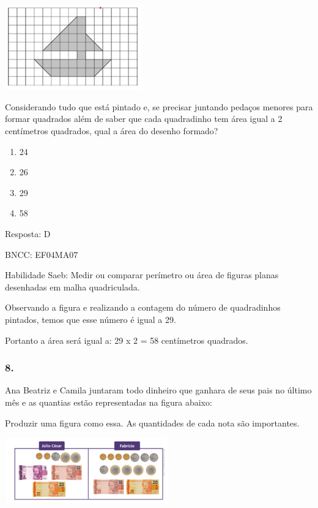 \includegraphics[width=2.32692in,height=1.43990in]{media/image144.png}

Considerando tudo que está pintado e, se precisar juntando pedaços
menores para formar quadrados além de saber que cada quadradinho tem
área igual a 2 centímetros quadrados, qual a área do desenho formado?

\begin{enumerate}
\def\labelenumi{\alph{enumi})}
\item
  24
\item
  26
\item
  29
\item
  58
\end{enumerate}

Resposta: D

BNCC: EF04MA07

Habilidade Saeb: Medir ou comparar perímetro ou área de figuras planas
desenhadas em malha quadriculada.

Observando a figura e realizando a contagem do número de quadradinhos
pintados, temos que esse número é igual a 29.

Portanto a área será igual a: 29 x 2 = 58 centímetros quadrados.

\subsubsection{8.}\label{section-149}

Ana Beatriz e Camila juntaram todo dinheiro que ganhara de seus pais no
último mês e as quantias estão representadas na figura abaixo:

Produzir uma figura como essa. As quantidades de cada nota são
importantes.

\includegraphics[width=2.77564in,height=1.11703in]{media/image145.png}

